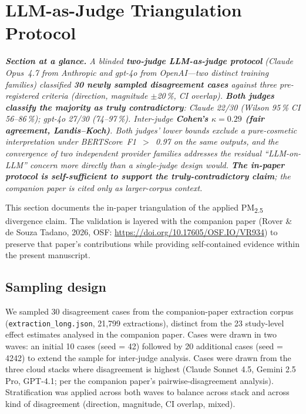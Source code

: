 \documentclass[11pt]{article}
\begin{document}
\section{LLM-as-Judge Triangulation Protocol}\label{sec:s12}

\textit{\textbf{Section at a glance.} A blinded \textbf{two-judge LLM-as-judge protocol} (Claude Opus~4.7 from Anthropic and gpt-4o from OpenAI---two distinct training families) classified \textbf{30 newly sampled disagreement cases} against three pre-registered criteria (direction, magnitude $\pm$20\,\%, CI overlap). \textbf{Both judges classify the majority as truly contradictory}: Claude 22/30 (Wilson 95\,\% CI 56--86\,\%); gpt-4o 27/30 (74--97\,\%). Inter-judge \textbf{Cohen's $\kappa = 0.29$ (fair agreement, Landis--Koch)}. Both judges' lower bounds exclude a pure-cosmetic interpretation under BERTScore~F1~$>$~0.97 on the same outputs, and the convergence of two independent provider families addresses the residual ``LLM-on-LLM'' concern more directly than a single-judge design would. \textbf{The in-paper protocol is self-sufficient to support the truly-contradictory claim}; the companion paper is cited only as larger-corpus context.}

This section documents the in-paper triangulation of the applied PM\textsubscript{2.5} divergence claim. The validation is layered with the companion paper (Rover \& de Souza Tadano, 2026, OSF: \url{https://doi.org/10.17605/OSF.IO/VR934}) to preserve that paper's contributions while providing self-contained evidence within the present manuscript.

\subsection{Sampling design}

We sampled 30 disagreement cases from the companion-paper extraction corpus (\texttt{extraction\_long.json}, 21{,}799 extractions), distinct from the 23 study-level effect estimates analysed in the companion paper. Cases were drawn in two waves: an initial 10 cases (seed = 42) followed by 20 additional cases (seed = 4242) to extend the sample for inter-judge analysis. Cases were drawn from the three cloud stacks where disagreement is highest (Claude Sonnet 4.5, Gemini 2.5 Pro, GPT-4.1; per the companion paper's pairwise-disagreement analysis). Stratification was applied across both waves to balance across stack and across kind of disagreement (direction, magnitude, CI overlap, mixed).
\end{document}

